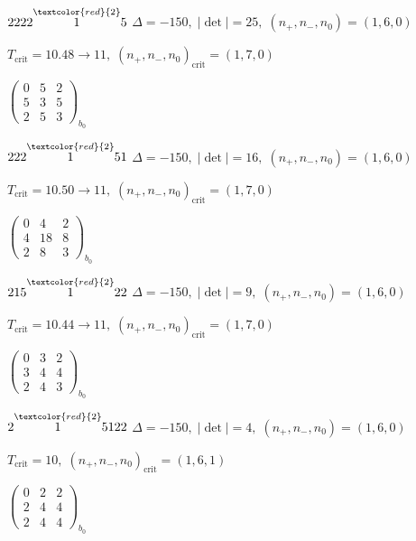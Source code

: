 \documentclass[10pt]{article}
\begin{document}
\smallskip

$2222\overset{\textcolor{red}{2}}{1}5$ \quad $\Delta=-150,\; |\det|=25,\; (n_+,n_-,n_0)=(1,6,0)$

\hspace{1em}$T_{\text{crit}}=10.48 \to 11,\; (n_+,n_-,n_0)_{\text{crit}}=(1,7,0)$

\hspace{2em}$\left(\begin{smallmatrix}0 & 5 & 2 \\ 5 & 3 & 5 \\ 2 & 5 & 3\end{smallmatrix}\right)_{\!b_0}$

\smallskip

$222\overset{\textcolor{red}{2}}{1}51$ \quad $\Delta=-150,\; |\det|=16,\; (n_+,n_-,n_0)=(1,6,0)$

\hspace{1em}$T_{\text{crit}}=10.50 \to 11,\; (n_+,n_-,n_0)_{\text{crit}}=(1,7,0)$

\hspace{2em}$\left(\begin{smallmatrix}0 & 4 & 2 \\ 4 & 18 & 8 \\ 2 & 8 & 3\end{smallmatrix}\right)_{\!b_0}$

\smallskip

$215\overset{\textcolor{red}{2}}{1}22$ \quad $\Delta=-150,\; |\det|=9,\; (n_+,n_-,n_0)=(1,6,0)$

\hspace{1em}$T_{\text{crit}}=10.44 \to 11,\; (n_+,n_-,n_0)_{\text{crit}}=(1,7,0)$

\hspace{2em}$\left(\begin{smallmatrix}0 & 3 & 2 \\ 3 & 4 & 4 \\ 2 & 4 & 3\end{smallmatrix}\right)_{\!b_0}$

$2\overset{\textcolor{red}{2}}{1}5122$ \quad $\Delta=-150,\; |\det|=4,\; (n_+,n_-,n_0)=(1,6,0)$

\hspace{1em}$T_{\text{crit}}=10,\; (n_+,n_-,n_0)_{\text{crit}}=(1,6,1)$

\hspace{2em}$\left(\begin{smallmatrix}0 & 2 & 2 \\ 2 & 4 & 4 \\ 2 & 4 & 4\end{smallmatrix}\right)_{\!b_0}$
\end{document}
